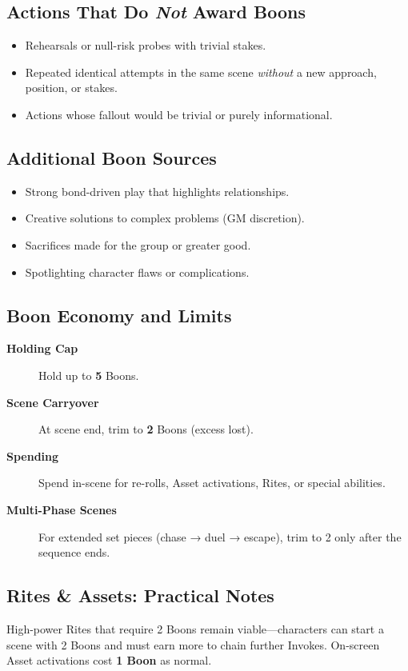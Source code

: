 \subsection{Actions That Do \emph{Not} Award Boons}
\label{subsec:no-boon-actions}
\begin{itemize}
\item Rehearsals or null-risk probes with trivial stakes.
\item Repeated identical attempts in the same scene \emph{without} a new approach, position, or stakes.
\item Actions whose fallout would be trivial or purely informational.
\end{itemize}

\subsection{Additional Boon Sources}
\label{subsec:other-boon-sources}
\begin{itemize}
\item Strong bond-driven play that highlights relationships.
\item Creative solutions to complex problems (GM discretion).
\item Sacrifices made for the group or greater good.
\item Spotlighting character flaws or complications.
\end{itemize}

\subsection{Boon Economy and Limits}
\label{subsec:boon-economy}
\begin{description}
\item[\textbf{Holding Cap}] Hold up to \textbf{5} Boons. 
\item[\textbf{Scene Carryover}] At scene end, trim to \textbf{2} Boons (excess lost). 
\item[\textbf{Spending}] Spend in-scene for re-rolls, Asset activations, Rites, or special abilities. 
\item[\textbf{Multi-Phase Scenes}] For extended set pieces (chase → duel → escape), trim to 2 only after the sequence ends. 
\end{description}

\subsection{Rites \& Assets: Practical Notes}
\label{subsec:rite-asset-notes}
High-power Rites that require 2 Boons remain viable—characters can start a scene with 2 Boons and must earn more to chain further Invokes. On-screen Asset activations cost \textbf{1 Boon} as normal. 

